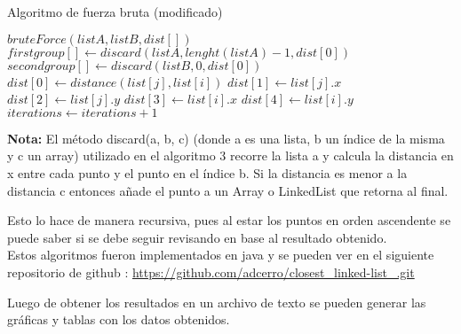 \begin{algorithm}[h!]
\caption{Algoritmo de fuerza bruta (modificado)}
\begin{algorithmic}
\State $bruteForce(listA, listB, dist[])$
    \State $firstgroup[] \gets discard(listA,lenght(listA)-1,dist[0])$
    \State $secondgroup[] \gets discard(listB,0,dist[0])$
            \State $dist[0] \gets distance(list[j], list[i])$
            \State $ dist[1] \gets list[j].x$
            \State $ dist[2] \gets list[j].y$
            \State $ dist[3] \gets list[i].x$
            \State $ dist[4] \gets list[i].y$
        \EndIf
        \EndFor
        \State $ iterations \gets iterations + 1$
    \EndFor
\end{algorithmic}    
\end{algorithm}
\FloatBarrier
\textbf{Nota: } El método discard(a, b, c) (donde a es una lista, b un índice de la misma y c un array) utilizado en el algoritmo 3 recorre la lista a y calcula la distancia en x entre cada punto y el punto en el índice b. Si la distancia es menor a la distancia c entonces añade el punto a un Array o LinkedList que retorna al final.

Esto lo hace de manera recursiva, pues al estar los puntos en orden ascendente se puede saber si se debe seguir revisando en base al resultado obtenido.\\

Estos algoritmos fueron implementados en java y se pueden ver en el siguiente repositorio de github : \url{https://github.com/adcerro/closest_linked-list_.git}

Luego de obtener los resultados en un archivo de texto se pueden generar las gráficas y tablas con los datos obtenidos.